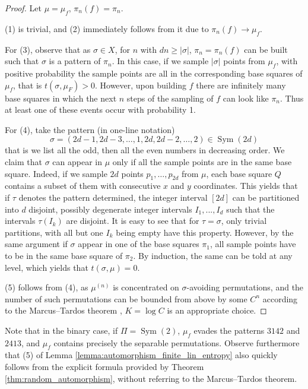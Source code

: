 \documentclass[11pt]{article}
\newcommand{\Sym}{\mathop{\mathrm{Sym}}}
\theoremstyle{definition}
\begin{document}
\begin{proof}
    Let $\mu=\mu_f$, $\pi_n(f)=\pi_n$.

    (1) is trivial, and (2) immediately follows from it due to $\pi_n(f)\to \mu_f$.

    For (3), observe that as $\sigma \in X$, for $n$ with $dn\geq |\sigma|$, $\pi_n=\pi_n(f)$ can be built such that $\sigma$ is a pattern of $\pi_n$. In this case, if we sample $|\sigma|$ points from $\mu_f$, with positive probability the sample points are all in the corresponding base squares of $\mu_f$, that is $t(\sigma, \mu_F)>0$. However, upon building $f$ there are infinitely many base squares in which the next $n$ steps of the sampling of $f$ can look like $\pi_n$. Thus at least one of these events occur with probability 1.
    
    For (4), take the pattern (in one-line notation)
    $$\sigma = (2d-1, 2d-3, \dots, 1, 2d, 2d-2, \dots, 2)\in \Sym(2d)$$
    that is we list all the odd, then all the even numbers in decreasing order. We claim that $\sigma$ can appear in $\mu$ only if all the sample points are in the same base square. Indeed, if we sample $2d$ points $p_1, \dots, p_{2d}$ from $\mu$, each base square $Q$ contains a subset of them with consecutive $x$ and $y$ coordinates. This yields that if $\tau$ denotes the pattern determined, the integer interval $[2d]$ can be partitioned into $d$ disjoint, possibly degenerate integer intervals $I_1, ..., I_{d}$ such that the intervals $\tau(I_k)$ are disjoint. It is easy to see that for $\tau=\sigma$, only trivial partitions, with all but one $I_k$ being empty have this property. However, by the same argument if $\sigma$ appear in one of the base squares $\pi_1$, all sample points have to be in the same base square of $\pi_2$. By induction, the same can be told at any level, which yields that $t(\sigma, \mu)=0$. 
    
    (5) follows from (4), as $\mu^{(n)}$ is concentrated on $\sigma$-avoiding permutations, and the number of such permutations can be bounded from above by some $C^n$ according to the Marcus--Tardos theorem \cite{MARCUS2004153}, $K= \log C$ is an appropriate choice.
\end{proof}

Note that in the binary case, if $\Pi=\Sym(2)$, $\mu_f$ evades the patterns $3142$ and $2413$, and $\mu_f$ contains precisely the separable permutations. Observe furthermore that (5) of Lemma \ref{lemma:automorphism_finite_lin_entropy} also quickly follows from the explicit formula provided by Theorem \ref{thm:random_automorphism}, without referring to the Marcus--Tardos theorem.
\end{document}
